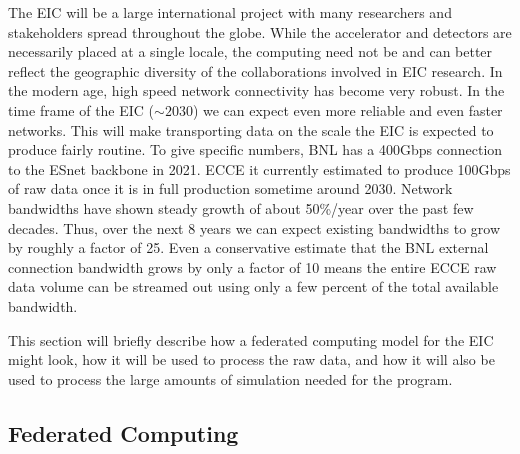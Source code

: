 




The EIC will be a large international project with many researchers and stakeholders spread throughout the globe. While the accelerator and detectors are necessarily placed at a single locale, the computing need not be and can better reflect the geographic diversity of the collaborations involved in EIC research. In the modern age, high speed network connectivity has become very robust. In the time frame of the EIC ($\sim 2030$) we can expect even more reliable and even faster networks. This will make transporting data on the scale the EIC is expected to produce fairly routine. To give specific numbers, BNL has a 400Gbps connection to the ESnet backbone in 2021. ECCE it currently estimated to produce 100Gbps of raw data once it is in full production sometime around 2030. Network bandwidths have shown steady growth of about 50\%/year over the past few decades\cite{nielsensLaw2019}. Thus, over the next 8 years we can expect existing bandwidths to grow by roughly a factor of 25. Even a conservative estimate that the BNL external connection bandwidth grows by only a factor of 10 means the entire ECCE raw data volume can be streamed out using only a few percent of the total available bandwidth.

This section will briefly describe how a federated computing model for the EIC might look, how it will be used to process the raw data, and how it will also be used to process the large amounts of simulation needed for the program.

\subsection{Federated Computing}

